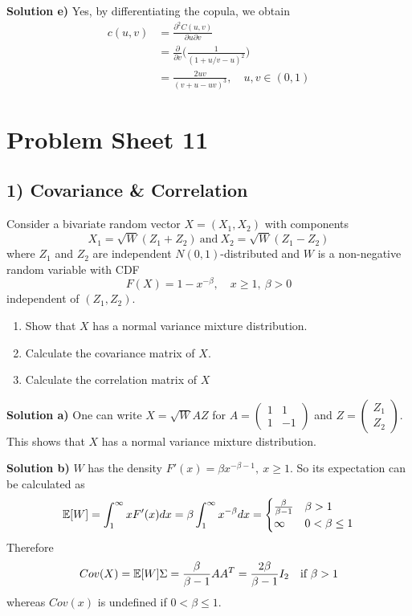 \textbf{Solution e)} Yes, by differentiating the copula, we obtain
\begin{align*}
    c(u,v) &= \frac{\partial^2 C(u,v)}{\partial u \partial v} \\
    &= \frac{\partial}{\partial v}\bigg(\frac{1}{(1 + u/v - u)^2}\bigg) \\
    &= \frac{2uv}{(v+u-uv)^3}, \quad u,v\in(0,1)
\end{align*}

%
%
\section*{Problem Sheet 11}
%
%
\subsection*{1) Covariance \& Correlation}
Consider a bivariate random vector $X = (X_1, X_2)$ with components
\[
    X_1 = \sqrt{W}(Z_1 + Z_2) \ \text{and} \ X_2 = \sqrt{W}(Z_1 - Z_2)
\]
where $Z_1$ and $Z_2$ are independent $N(0,1)$-distributed and $W$ is a non-negative random variable with CDF
\[
    F(X) = 1 - x^{-\beta}, \quad x\geq 1, \ \beta > 0
\]
independent of $(Z_1, Z_2)$.
\begin{enumerate}[label=(\alph*)]
    \item Show that $X$ has a normal variance mixture distribution.
    \item Calculate the covariance matrix of $X$.
    \item Calculate the correlation matrix of $X$
\end{enumerate}

\textbf{Solution a)}
One can write $X = \sqrt{W} AZ$ for $A = \begin{pmatrix} 1 & 1 \\ 1 & -1 \end{pmatrix}$ and $Z = \begin{pmatrix} Z_1 \\ Z_2 \end{pmatrix}$.  This shows that $X$ has a normal variance mixture distribution.

\textbf{Solution b)} $W$ has the density $F'(x) = \beta x^{-\beta-1}, \ x\geq 1$. So its expectation can be calculated as
\[
    \mathbb{E}[W] = \int_1^\infty xF'(x) dx = \beta \int_1^\infty x^{-\beta} dx = \begin{cases} \frac{\beta}{\beta-1} & \beta > 1 \\ \infty & 0 < \beta \leq 1 \end{cases}
\]
Therefore
\[
    Cov(X) = \mathbb{E}[W]\Sigma = \frac{\beta}{\beta -1}A A^T = \frac{2\beta}{\beta -1}I_2 \quad \text{if} \ \beta > 1
\]
whereas $Cov(x)$ is undefined if $0 < \beta \leq 1$.


